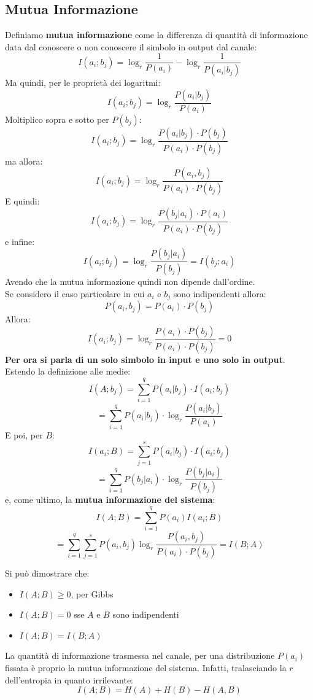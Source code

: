 \documentclass[a4paper,12pt, oneside]{book}
\begin{document}
\subsection{Mutua Informazione}
\begin{definizione}
  Definiamo \textbf{mutua informazione} come la differenza di quantità di
  informazione data dal conoscere o non conoscere il simbolo in output dal
  canale:
  \[I(a_i;b_j)=\log_r \frac{1}{P(a_i)}-\log_r\frac{1}{P(a_i|b_j)}\]
  Ma quindi, per le proprietà dei logaritmi:
  \[I(a_i;b_j)=\log_r\frac{P(a_i|b_j)}{P(a_i)}\]
  Moltiplico sopra e sotto per $P(b_j)$:
  \[I(a_i;b_j)=\log_r\frac{P(a_i|b_j)\cdot P(b_j)}{P(a_i)\cdot P(b_j)}\]
  ma allora:
  \[I(a_i;b_j)=\log_r\frac{P(a_i,b_j)}{P(a_i)\cdot P(b_j)}\]
  E quindi:
  \[I(a_i;b_j)=\log_r\frac{P(b_j|a_i)\cdot P(a_i)}{P(a_i)\cdot P(b_j)}\]
  e infine:
  \[I(a_i;b_j)=\log_r\frac{P(b_j|a_i)}{P(b_j)}=I(b_j;a_i)\]
  Avendo che la mutua informazione quindi non dipende dall'ordine.\\
  Se considero il caso particolare in cui $a_i$ e $b_j$ sono indipendenti allora:
  \[P(a_i,b_j)=P(a_i)\cdot P(b_j)\]
  Allora:
  \[I(a_i;b_j)=\log_r\frac{P(a_i)\cdot P(b_j)}{P(a_i)\cdot P(b_j)}=0\]
  \textbf{Per ora si parla di un solo simbolo in input e uno solo in output}.\\
  Estendo la definizione alle medie:
  \[I(A;b_j)=\sum_{i=1}^q P(a_i|b_j)\cdot I(a_i;b_j)\]
  \[=\sum_{i=1}^q P(a_i|b_j)\cdot\log_r\frac{P(a_i|b_j)}{P(a_i)}\]
  E poi, per $B$:
  \[I(a_i;B)=\sum_{j=1}^s P(a_i|b_j)\cdot I(a_i;b_j)\]
  \[=\sum_{i=1}^q P(b_j|a_i)\cdot\log_r\frac{P(b_j|a_i)}{P(b_j)}\]
  e, come ultimo, la \textbf{mutua informazione del sistema}:
  \[I(A;B)=\sum_{i=1}^q P(a_i) I(a_i;B)\]
  \[=\sum_{i=1}^q\sum_{j=1}^s P(a_i,b_j)\log_r\frac{P(a_i,b_j)}{P(a_i)\cdot
      P(b_j)}=I(B;A)\]
\end{definizione}
\begin{teorema}
  Si può dimostrare che:
  \begin{itemize}
    \item $I(A;B)\geq 0$, per Gibbs
    \item $I(A;B)=0$ sse $A$ e $B$ sono indipendenti
    \item $I(A;B)=I(B;A)$
  \end{itemize}
\end{teorema}
La quantità di informazione trasmessa nel canale, per una distribuzione $P(a_i)$
fissata è proprio la mutua informazione del sistema. Infatti, tralasciando la
$r$ dell'entropia in quanto irrilevante:
\[I(A;B)=H(A)+H(B)-H(A,B)\]
\end{document}
